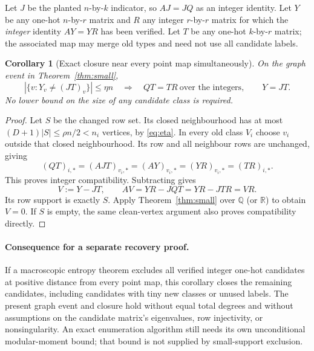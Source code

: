 \documentclass[11pt]{article}
\newtheorem{corollary}{Corollary}
\begin{document}
Let $J$ be the planted $n$-by-$k$ indicator, so $AJ=JQ$ as an
integer identity. Let $Y$ be any one-hot $n$-by-$r$ matrix and
$R$ any integer $r$-by-$r$ matrix for which the \emph{integer}
identity $AY=YR$ has been verified. Let $T$ be any one-hot
$k$-by-$r$ matrix; the associated map may merge old types and need
not use all candidate labels.

\begin{corollary}[Exact closure near every point map simultaneously]
On the graph event in Theorem~\ref{thm:small},
\[
 |\{v:Y_v\ne(JT)_v\}|\le\eta n
 \quad\Longrightarrow\quad QT=TR\ \text{over the integers},
 \qquad Y=JT.
\]
No lower bound on the size of any candidate class is required.
\end{corollary}
\begin{proof}
Let $S$ be the changed row set. Its closed neighbourhood has at most
$(D+1)|S|\le\rho n/2<n_i$ vertices, by \eqref{eq:eta}. In every
old class $V_i$ choose $v_i$ outside that closed neighbourhood.
Its row and all neighbour rows are unchanged, giving
\[
 (QT)_{i,*}=(AJT)_{v_i,*}=(AY)_{v_i,*}
           =(YR)_{v_i,*}=(TR)_{i,*}.
\]
This proves integer compatibility. Subtracting gives
\[
 V:=Y-JT,\qquad AV=YR-JQT=YR-JTR=VR.
\]
Its row support is exactly $S$. Apply Theorem~\ref{thm:small} over
$\mathbb Q$ (or $\mathbb R$) to obtain $V=0$. If $S$ is empty,
the same clean-vertex argument also proves compatibility directly.
\end{proof}

\paragraph{Consequence for a separate recovery proof.}
If a macroscopic entropy theorem excludes all verified integer one-hot
candidates at positive distance from every point map, this corollary
closes the remaining candidates, including candidates with tiny new
classes or unused labels. The present graph event and closure hold
without equal total degrees and without assumptions on the candidate
matrix's eigenvalues, row injectivity, or nonsingularity. An exact
enumeration algorithm still needs its own unconditional modular-moment
bound; that bound is not supplied by small-support exclusion.
\end{document}
